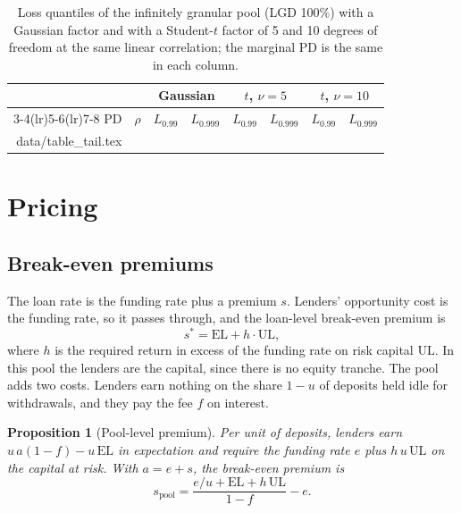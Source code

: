 \documentclass[11pt]{article}
\makeatletter
\theoremstyle{plain}
\newtheorem{proposition}{Proposition}
\theoremstyle{definition}
\newcommand{\inputrows}[1]{\@@input #1 }
\newcommand{\EL}{\mathrm{EL}}
\newcommand{\UL}{\mathrm{UL}}
\makeatother
\begin{document}
\begin{table}[ht]
  \centering\small
  \caption{Loss quantiles of the infinitely granular pool (LGD 100\%) with a Gaussian factor and with
  a Student-$t$ factor of 5 and 10 degrees of freedom at the same linear correlation; the marginal PD
  is the same in each column.}
  \label{tab:tail}
  \begin{tabular}{rlrrrrrr}
    \toprule
    & & \multicolumn{2}{c}{Gaussian} & \multicolumn{2}{c}{$t$, $\nu=5$} & \multicolumn{2}{c}{$t$, $\nu=10$} \\
    \cmidrule(lr){3-4}\cmidrule(lr){5-6}\cmidrule(lr){7-8}
    PD & $\rho$ & $L_{0.99}$ & $L_{0.999}$ & $L_{0.99}$ & $L_{0.999}$ & $L_{0.99}$ & $L_{0.999}$ \\
    \midrule
    \inputrows{data/table_tail.tex}
    \bottomrule
  \end{tabular}
\end{table}

\section{Pricing}\label{sec:pricing}

\subsection{Break-even premiums}

The loan rate is the funding rate plus a premium $s$. Lenders' opportunity cost is the funding
rate, so it passes through, and the loan-level break-even premium is
\begin{equation}\label{eq:sloan}
  s^*=\EL+h\cdot\UL,
\end{equation}
where $h$ is the required return in excess of the funding rate on risk capital $\UL$. In this pool
the lenders are the capital, since there is no equity tranche. The pool adds two costs. Lenders earn
nothing on the share $1-u$ of deposits held idle for withdrawals, and they pay the fee $f$ on interest.

\begin{proposition}[Pool-level premium]\label{prop:pool}
Per unit of deposits, lenders earn $u\,a(1-f)-u\,\EL$ in expectation and require the funding rate
$e$ plus $h\,u\,\UL$ on the capital at risk. With $a=e+s$, the break-even premium is
\[
  s_{\mathrm{pool}}=\frac{e/u+\EL+h\,\UL}{1-f}-e.
\]
\end{proposition}
\end{document}
